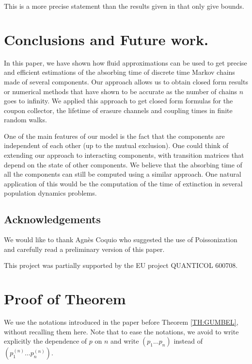 \documentclass{aptpub}
\begin{document}
This is a more precise statement than the results given in
\cite{peres} that only give bounds.


\section{Conclusions and Future work.}
\label{sec:conclusion}

In this paper, we have shown how fluid approximations can be used to
get precise and efficient estimations of the absorbing time of
discrete time Markov chains made of several components. Our approach
allows us to obtain closed form results or numerical methods that have
shown to be accurate as the number of chains $n$ goes to infinity.
We applied this approach to get closed form formulas for the coupon
collector, the lifetime of erasure channels and coupling times in
finite random walks.


One of the main features of our model is the fact that the components are
independent of each other (up to the mutual exclusion).  One could
think of extending our approach to interacting components, with
transition matrices that depend on the state of other components.  We
believe that the absorbing time of all the components can still be
computed using a similar approach.  One natural application of this
would be the computation of the time of extinction in several population dynamics
problems.
 
\subsection*{Acknowledgements}
We would like to thank Agn\`es Coquio who suggested the use of Poissonization 
and carefully read a preliminary version of this paper.

This project was partially supported by the EU project QUANTICOL
600708. 

\appendix

\section{Proof of Theorem \protect{\ref{TH:GUMBEL}}}
\label{sec:proof1}


We use the notations introduced in the paper before Theorem
\ref{TH:GUMBEL}, without recalling them here.  Note that to ease the
notations, we avoid to write explicitly the dependence of $p$ on $n$
and write $(p_1\dots p_n)$ instead of $(p^{(n)}_1\dots p^{(n)}_n)$.
\end{document}
